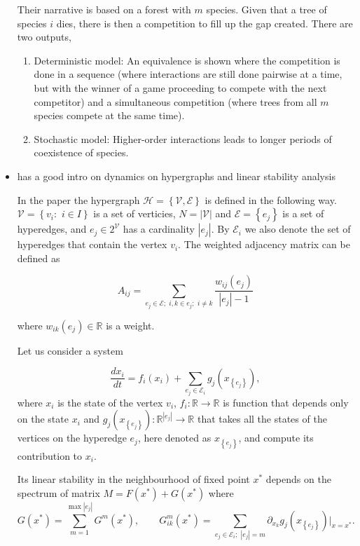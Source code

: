 \documentclass[a4paper,12pt]{article}
\theoremstyle{definition}
\theoremstyle{remark}
\newcommand{\HH}{\mathcal{H}}
\newcommand{\V}{\mathcal{V}}
\newcommand{\E}{\mathcal{E}}
\newcommand{\RR}{\mathbb{R}}
\begin{document}
\begin{itemize}
Their narrative is based on a forest with $ m $ species. Given that a tree of species $ i $ dies, there is then a competition to fill up the gap created. There are two outputs,
\begin{enumerate}
    \item Deterministic model: An equivalence is shown where the competition is done in a sequence (where interactions are still done pairwise at a time, but with the winner of a game proceeding to compete with the next competitor) and a simultaneous competition (where trees from all $ m $ species compete at the same time).
    \item Stochastic model: Higher-order interactions leads to longer periods of coexistence of species.
\end{enumerate}

    \item \cite{Arruda} 
    has a good intro on dynamics on hypergraphs and linear stability analysis
    
    In the paper the hypergraph $\HH =\left\{\V,\E\right\}$ is defined in the following way. $\V=\left\{ v_i:\,\,i\in I\right\}$ is a set of verticies, $N=|\V|$ and $\E=\left\{e_j\right\}$ is a set of hyperedges, and $e_j\in 2^{\V}$ has a cardinality $|e_j|$. By $\E_i$ we also denote the set of hyperedges that contain the vertex $v_i$. The weighted adjacency matrix can be defined as

\[
A_{ij}=\sum_{e_j\in \E;\,\, i,k\in e_j;\,\,i\neq k }\frac{w_{ij}(e_j)}{|e_j|-1}
\]

where $w_{ik}(e_j)\in \RR$ is a weight.

    Let us consider a system

    \begin{equation}\label{eq:main}
\frac{dx_i}{dt}=f_i(x_i)+\sum_{e_j\in \E_i}g_j(x_{\left\{e_j\right\}}),
    \end{equation}
    where $x_i$ is the state of the vertex $v_i$, $f_i:\RR \rightarrow \RR$ is function that depends only on the state $x_i$ and $g_j(x_{\left\{e_j\right\}}):\RR^{|e_j|}\rightarrow \RR$ that takes all the states of the vertices on the hyperedge $e_j$, here denoted as $x_{\left\{e_j\right\}}$, and compute its contribution to $x_i$.

    Its linear stability in the neighbourhood of fixed point $x^*$ depends on the spectrum of matrix $M=F(x^*)+G(x^*)$ where 
    \[
    G(x^*)=\sum_{m=1}^{\max{|e_j|}}G^m(x^*), \qquad G^m_{ik}(x^*)=\sum_{e_j\in \E_i;\,\,|e_j|=m}\partial_{x_k}g_j(x_{\left\{e_j\right\}})|_{x=x^*}.
    \]


\end{itemize}
\end{document}
